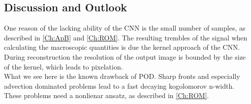 \subsection{Discussion and Outlook}
 One reason of the lacking ability of the CNN is the small number of samples, as described in \cref{Ch:ApB} and \cref{Ch:ROM}. The resulting trembles of the signal when calculating the macroscopic quantities is due the kernel approach of the CNN. During reconstruction the resolution of the output image is bounded by the size of the kernel, which leads to pixelation.\\
  What we see here is the known drawback of POD. Sharp fronts and especially advection dominated problems lead to a fast decaying kogolomorov n-width. These problems need a nonlienar ansatz, as described in \cref{Ch:ROM}.
